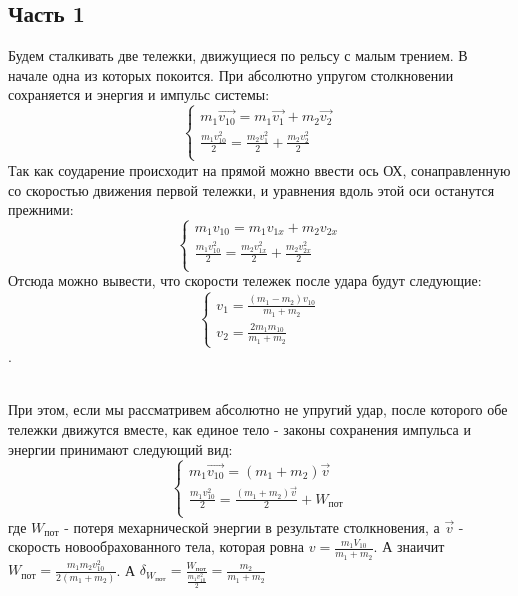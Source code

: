 \documentclass[20pt]{article}
\begin{document}
\subsection*{Часть 1}
Будем сталкивать две тележки, движущиеся по рельсу с малым трением. В начале одна из которых покоится. При абсолютно упругом столкновении сохраняется и энергия и импульс системы:
\begin{equation*}
        \left\{ 
        \begin{array}{l}
            m_1\overrightarrow{v_{10}} = m_1\overrightarrow{v_1} + m_2\overrightarrow{v_2}\\
            \frac{m_1 v_{10}^2}{2} = \frac{m_2 v_{1}^2}{2} + \frac{m_2 v_{2}^2}{2}\\
        \end{array}
        \right. 
\end{equation*}
Так как соударение происходит на прямой можно ввести ось ОХ, сонаправленную со скоростью движения первой тележки, и уравнения вдоль этой оси останутся прежними: 
\begin{equation*}
        \left\{ 
        \begin{array}{l}
            m_1 v_{10} = m_1 v_{1x} + m_2 v_{2x}\\
            \frac{m_1 v_{10}^2}{2} = \frac{m_2 v_{1x}^2}{2} + \frac{m_2 v_{2x}^2}{2}\\
        \end{array}
        \right. 
\end{equation*}
Отсюда можно вывести, что скорости тележек после удара будут следующие: 
\begin{equation*}
        \left\{ 
        \begin{array}{l}
            v_1 = \frac{(m_1-m_2)v_{10}}{m_1 + m_2}\\
            v_2 = \frac{2 m_1 m_{10}}{m_1 + m_2}
        \end{array}
        \right. 
\end{equation*}.

\\ При этом, если мы рассматривем абсолютно не упругий удар, после которого обе тележки движутся вместе, как единое тело - законы сохранения импульса и энергии принимают следующий вид:  
\begin{equation*}
        \left\{ 
        \begin{array}{l}
            m_1\overrightarrow{v_{10}} = (m_1 + m_2)\overrightarrow{v}\\
            \frac{m_1 v_{10}^2}{2} = \frac{(m_1 + m_2)\overrightarrow{v}}{2} + W_{пот}\\
        \end{array}
        \right. 
\end{equation*}
где $W_{пот}$ - потеря мехарнической энергии в результате столкновения, а $\overrightarrow{v}$ - скорость новообрахованного тела, которая ровна $v = \frac{m_1 V_{10}}{m_1 +m_2}$. А знаичит $W_{пот} = \frac{m_1 m_2 v_{10}^2}{2(m_1 + m_2)}$. А $\delta_{W_{пот}} = \frac{W_{пот}}{\frac{m_1 v_{10}^2}{2}} = \frac{m_2}{m_1 + m_2}$
\end{document}
